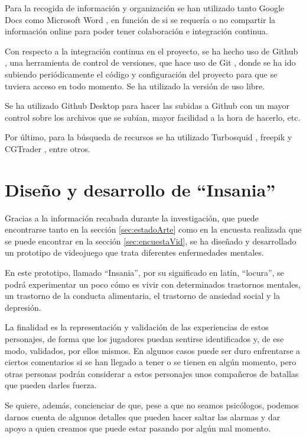 \documentclass[12pt, a4paper,twoside,titlepage]{book}
\begin{document}
Para la recogida de información y organización se han utilizado tanto Google Docs \cite{googledocs} como Microsoft Word \cite{word}, en función de si se requería o no compartir la información online para poder tener colaboración e integración continua.

Con respecto a la integración continua en el proyecto, se ha hecho uso de Github \cite{github}, una herramienta de control de versiones, que hace uso de Git \cite{git}, donde se ha ido subiendo periódicamente el código y configuración del proyecto para que se tuviera acceso en todo momento. Se ha utilizado la versión de uso libre. 

Se ha utilizado Github Desktop  para hacer las subidas a Github con un mayor control sobre los archivos que se subían, mayor facilidad a la hora de hacerlo, etc. 

Por último, para la búsqueda de recursos se ha utilizado Turbosquid , freepik  y CGTrader , entre otros. 




\chapter{Diseño y desarrollo de ``Insania''}
\label{sec:diseñoInsania}
Gracias a la información recabada durante la investigación, que puede encontrarse tanto en la sección \ref{sec:estadoArte} como en la encuesta realizada que se puede encontrar en la sección \ref{sec:encuestaVid}, se ha diseñado y desarrollado un prototipo de videojuego que trata diferentes enfermedades mentales. 

En este prototipo, llamado ``Insania'', por su significado en latín, ``locura'', se podrá experimentar un poco cómo es vivir con determinados trastornos mentales, un trastorno de la conducta alimentaria, el trastorno de ansiedad social y la depresión. 

La finalidad es la representación y validación de las experiencias de estos personajes, de forma que los jugadores puedan sentirse identificados y, de ese modo, validados, por ellos mismos. En algunos casos puede ser duro enfrentarse a ciertos comentarios si se han llegado a tener o se tienen en algún momento, pero otras personas podrán considerar a estos personajes unos compañeros de batallas que pueden darles fuerza.

Se quiere, además, concienciar de que, pese a que no seamos psicólogos, podemos darnos cuenta de algunos detalles que pueden hacer saltar las alarmas y dar apoyo a quien creamos que puede estar pasando por algún mal momento. 
\end{document}
